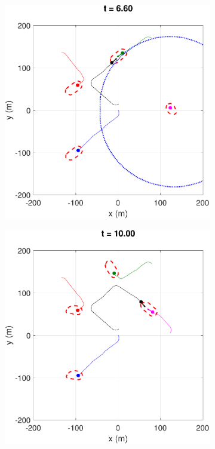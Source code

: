 \begin{figure}[H]
\begin{subfigure}{.5\columnwidth}
  \subcaption{}
  \label{fig:worstcase2}
\end{subfigure}
\begin{subfigure}{.5\columnwidth}
  \centering
  \includegraphics[width=\columnwidth]{figs/simulate_bufferRegion_properties_worst_3}
  \subcaption{}
  \label{fig:worstcase3}
\end{subfigure}%
\begin{subfigure}{.5\columnwidth}
  \centering
  \includegraphics[width=\columnwidth]{figs/simulate_bufferRegion_properties_worst_4}

\end{subfigure}
\end{figure}
